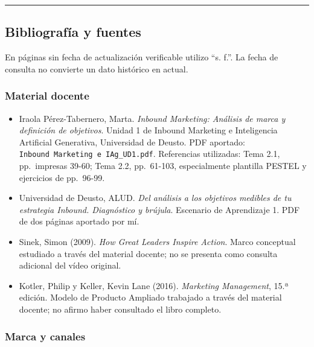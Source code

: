 \documentclass[
]{article}
\providecommand{\tightlist}{%
  \setlength{\itemsep}{0pt}\setlength{\parskip}{0pt}}
\begin{document}
\begin{center}\rule{0.5\linewidth}{0.5pt}\end{center}

\hypertarget{bibliografuxeda-y-fuentes}{%
\subsection{Bibliografía y fuentes}\label{bibliografuxeda-y-fuentes}}

En páginas sin fecha de actualización verificable utilizo ``s. f.''. La
fecha de consulta no convierte un dato histórico en actual.

\hypertarget{material-docente}{%
\subsubsection{Material docente}\label{material-docente}}

\begin{itemize}
\tightlist
\item
  Iraola Pérez-Tabernero, Marta. \emph{Inbound Marketing: Análisis de
  marca y definición de objetivos}. Unidad 1 de Inbound Marketing e
  Inteligencia Artificial Generativa, Universidad de Deusto. PDF
  aportado: \texttt{Inbound\ Marketing\ e\ IAg\_UD1.pdf}. Referencias
  utilizadas: Tema 2.1, pp.~impresas 39-60; Tema 2.2, pp.~61-103,
  especialmente plantilla PESTEL y ejercicios de pp.~96-99.
\item
  Universidad de Deusto, ALUD. \emph{Del análisis a los objetivos
  medibles de tu estrategia Inbound. Diagnóstico y brújula}. Escenario
  de Aprendizaje 1. PDF de dos páginas aportado por mí.
\item
  Sinek, Simon (2009). \emph{How Great Leaders Inspire Action}. Marco
  conceptual estudiado a través del material docente; no se presenta
  como consulta adicional del vídeo original.
\item
  Kotler, Philip y Keller, Kevin Lane (2016). \emph{Marketing
  Management}, 15.ª edición. Modelo de Producto Ampliado trabajado a
  través del material docente; no afirmo haber consultado el libro
  completo.
\end{itemize}

\hypertarget{marca-y-canales}{%
\subsubsection{Marca y canales}\label{marca-y-canales}}
\end{document}
